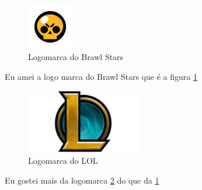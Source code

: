 \documentclass[a4paper]{article}
\begin{document}
\maketitle{}

\begin{figure}[ht]
\centering
\includegraphics[width=2cm]{marca.png} 
\caption{Logomarca do Brawl Stars}
\label{Fig01}
\end{figure}

Eu amei a logo marca do Brawl Stars que é a figura \ref{Fig01}

\begin{figure}
    \centering
    \includegraphics[width=5cm]{imagem.png}
    \caption{Logomarca do LOL}
    \label{Fig02}
\end{figure}

Eu gostei mais da logomarca \ref{Fig02} do que da \ref{Fig01}
\end{document}
